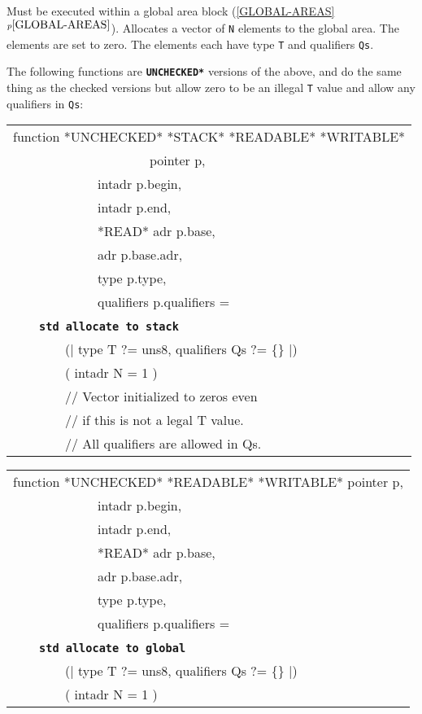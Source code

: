 \documentclass[12pt]{article}
\makeatletter
\newcommand{\TT}[1]{{\tt \bfseries #1}}
\newcommand{\ttstdkey}[1]{\TT{std #1}\index{#1@{\tt std #1}}}
\newcommand{\itemref}[1]{\ref{#1}$^{p\pageref{#1}}$}
\newenvironment{indpar}[1][0.3in]%
	{\begin{list}{}%
		     {\setlength{\itemsep}{0in}%
		      \setlength{\topsep}{0in}%
		      \setlength{\parsep}{1ex}%
		      \setlength{\labelwidth}{#1}%
		      \setlength{\leftmargin}{#1}%
		      \addtolength{\leftmargin}{\labelsep}}%
	 \item}%
	{\end{list}}
\makeatother
\begin{document}
\begin{indpar}
\begin{indpar}
Must be executed within a global area block (\itemref{GLOBAL-AREAS}).
Allocates a vector of {\tt N} elements to the global area.
The elements are set to zero.
The elements each have type {\tt T} and qualifiers {\tt Qs}.
\end{indpar}

\end{indpar}

The following functions are \TT{*UNCHECKED*} versions of the
above, and do the same thing as the checked versions but
allow zero to be an illegal {\tt T} value and allow any qualifiers
in {\tt Qs}:

\begin{indpar}

{\tt\begin{tabular}{@{}l}
function *UNCHECKED* *STACK* *READABLE* *WRITABLE* \\
~~~~~~~~~~~~~~~~~~~~~pointer p, \\
~~~~~~~~~~~~~intadr p.begin, \\
~~~~~~~~~~~~~intadr p.end, \\
~~~~~~~~~~~~~*READ* adr p.base, \\
~~~~~~~~~~~~~adr p.base.adr, \\
~~~~~~~~~~~~~type p.type, \\
~~~~~~~~~~~~~qualifiers p.qualifiers = \\
~~~~\ttstdkey{allocate to stack} \\
~~~~~~~~(| type T ?= uns8, qualifiers Qs ?= \{\} |) \\
~~~~~~~~( intadr N = 1 ) \\
~~~~~~~~// Vector initialized to zeros even \\
~~~~~~~~// if this is not a legal T value. \\
~~~~~~~~// All qualifiers are allowed in Qs. \\
\end{tabular}}

{\tt\begin{tabular}{@{}l}
function *UNCHECKED* *READABLE* *WRITABLE* pointer p, \\
~~~~~~~~~~~~~intadr p.begin, \\
~~~~~~~~~~~~~intadr p.end, \\
~~~~~~~~~~~~~*READ* adr p.base, \\
~~~~~~~~~~~~~adr p.base.adr, \\
~~~~~~~~~~~~~type p.type, \\
~~~~~~~~~~~~~qualifiers p.qualifiers = \\
~~~~\ttstdkey{allocate to global} \\
~~~~~~~~(| type T ?= uns8, qualifiers Qs ?= \{\} |) \\
~~~~~~~~( intadr N = 1 ) \\
\end{tabular}}

\end{indpar}
\end{document}
